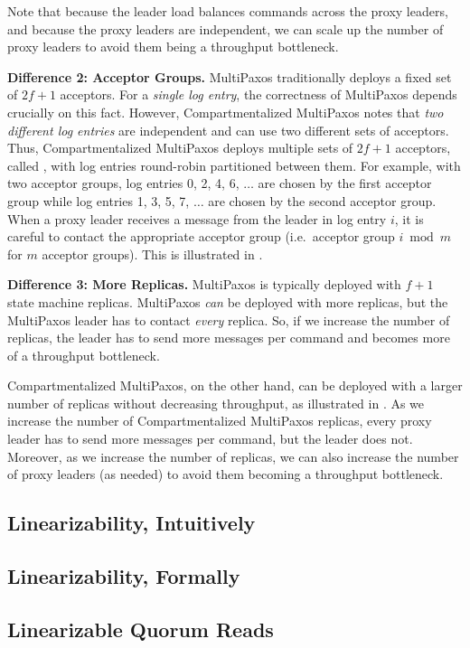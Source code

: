 Note that because the leader load balances commands across the proxy leaders,
and because the proxy leaders are independent, we can scale up the number of
proxy leaders to avoid them being a throughput bottleneck.

{}

\textbf{Difference 2: Acceptor Groups.}
MultiPaxos traditionally deploys a fixed set of $2f+1$ acceptors. For a
\emph{single log entry}, the correctness of MultiPaxos depends crucially on
this fact. However, Compartmentalized MultiPaxos notes that \emph{two
different log entries} are independent and can use two different sets of
acceptors.
%
Thus, Compartmentalized MultiPaxos deploys multiple sets of $2f+1$ acceptors,
called , with log entries round-robin partitioned
between them. For example, with two acceptor groups, log entries 0, 2, 4, 6,
$\ldots$ are chosen by the first acceptor group while log entries 1, 3, 5, 7,
$\ldots$ are chosen by the second acceptor group. When a proxy leader receives
a  message from the leader in log entry $i$, it is careful to
contact the appropriate acceptor group (i.e.\ acceptor group $i \bmod m$ for
$m$ acceptor groups).
%
This is illustrated in .

{}

\textbf{Difference 3: More Replicas.}
MultiPaxos is typically deployed with $f+1$ state machine replicas. MultiPaxos
\emph{can} be deployed with more replicas, but the MultiPaxos leader has to
contact \emph{every} replica. So, if we increase the number of replicas, the
leader has to send more messages per command and becomes more of a throughput
bottleneck.

Compartmentalized MultiPaxos, on the other hand, can be deployed with a larger
number of replicas without decreasing throughput, as illustrated in
. As we increase the number of
Compartmentalized MultiPaxos replicas, every proxy leader has to send more
messages per command, but the leader does not.  Moreover, as we increase the
number of replicas, we can also increase the number of proxy leaders (as
needed) to avoid them becoming a throughput bottleneck.

{}

\subsection{Linearizability, Intuitively}

\subsection{Linearizability, Formally}

\subsection{Linearizable Quorum Reads}
